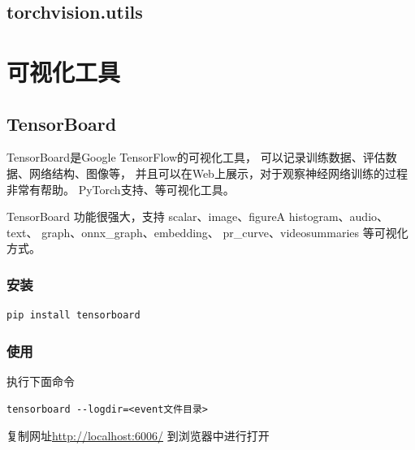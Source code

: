 \subsection{torchvision.utils}
\label{subsec:pytorch_torchvision.utils}









\section{可视化工具}
\label{sec:pytorch_可视化工具}
\subsection{TensorBoard}
\label{subsec:pytorch_tensorboard}
TensorBoard是Google TensorFlow的可视化工具，
可以记录训练数据、评估数据、网络结构、图像等，
并且可以在Web上展示，对于观察神经网络训练的过程非常有帮助。
PyTorch支持、等可视化工具。

TensorBoard 功能很强大，支持 scalar、image、figureA histogram、audio、text、
graph、onnx\_graph、embedding、 pr\_curve、videosummaries 等可视化方式。 

\subsubsection{安装}
\label{subsubsec:pytorch_tensorboard安装}
\begin{lstlisting}[style=demostyle,numbers=none] 
pip install tensorboard
\end{lstlisting}

\subsubsection{使用}
\label{subsubsec:pytorch_tensorboard使用}

执行下面命令
\begin{lstlisting}[style=demostyle,numbers=none] 
tensorboard --logdir=<event文件目录>
\end{lstlisting}

复制网址\url{http://localhost:6006/} 到浏览器中进行打开

